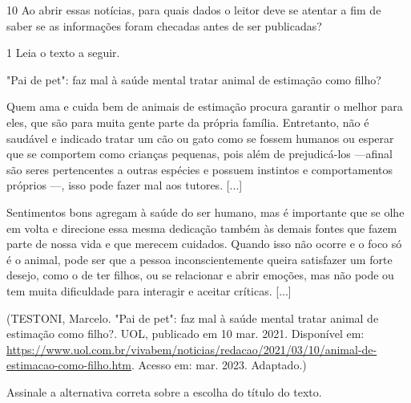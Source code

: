 {


\num{10} Ao abrir essas notícias, para quais dados o leitor deve se
atentar a fim de saber se as informações foram checadas antes de ser
publicadas?




\num{1} Leia o texto a seguir.

"Pai de pet": faz mal à saúde mental tratar animal de estimação como
filho?

Quem ama e cuida bem de animais de estimação procura garantir o melhor
para eles, que são para muita gente parte da própria família.
Entretanto, não é saudável e indicado tratar um cão ou gato como se
fossem humanos ou esperar que se comportem como crianças pequenas, pois
além de prejudicá-los ---afinal são seres pertencentes a outras espécies
e possuem instintos e comportamentos próprios ---, isso pode fazer mal
aos tutores. {[}...{]}

Sentimentos bons agregam à saúde do ser humano, mas é importante que se
olhe em volta e direcione essa mesma dedicação também às demais fontes
que fazem parte de nossa vida e que merecem cuidados. Quando isso não
ocorre e o foco só é o animal, pode ser que a pessoa inconscientemente
queira satisfazer um forte desejo, como o de ter filhos, ou se
relacionar e abrir emoções, mas não pode ou tem muita dificuldade para
interagir e aceitar críticas. {[}...{]}

(TESTONI, Marcelo. "Pai de pet": faz mal à saúde mental tratar animal de
estimação como filho?. UOL, publicado em 10 mar. 2021. Disponível em:
\url{https://www.uol.com.br/vivabem/noticias/redacao/2021/03/10/animal-de-estimacao-como-filho.htm}.
Acesso em: mar. 2023. Adaptado.)

Assinale a alternativa correta sobre a escolha do título do texto.

}
